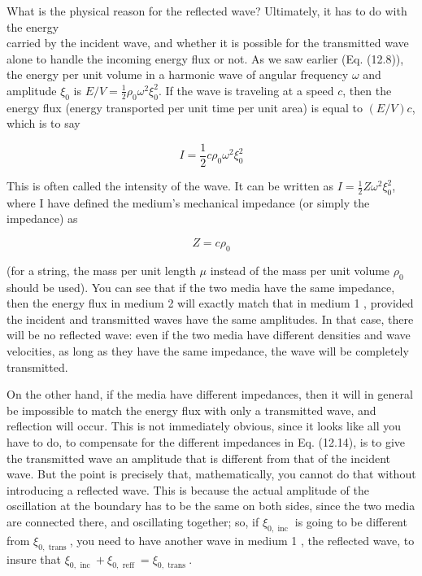 \documentclass[10pt]{article}
\begin{document}
What is the physical reason for the reflected wave? Ultimately, it has to do with the energy\\
carried by the incident wave, and whether it is possible for the transmitted wave alone to handle the incoming energy flux or not. As we saw earlier (Eq. (12.8)), the energy per unit volume in a harmonic wave of angular frequency $\omega$ and amplitude $\xi_{0}$ is $E / V=\frac{1}{2} \rho_{0} \omega^{2} \xi_{0}^{2}$. If the wave is traveling at a speed $c$, then the energy flux (energy transported per unit time per unit area) is equal to $(E / V) c$, which is to say


\begin{equation*}
I=\frac{1}{2} c \rho_{0} \omega^{2} \xi_{0}^{2} \tag{12.14}
\end{equation*}


This is often called the intensity of the wave. It can be written as $I=\frac{1}{2} Z \omega^{2} \xi_{0}^{2}$, where I have defined the medium's mechanical impedance (or simply the impedance) as


\begin{equation*}
Z=c \rho_{0} \tag{12.15}
\end{equation*}


(for a string, the mass per unit length $\mu$ instead of the mass per unit volume $\rho_{0}$ should be used). You can see that if the two media have the same impedance, then the energy flux in medium 2 will exactly match that in medium 1 , provided the incident and transmitted waves have the same amplitudes. In that case, there will be no reflected wave: even if the two media have different densities and wave velocities, as long as they have the same impedance, the wave will be completely transmitted.

On the other hand, if the media have different impedances, then it will in general be impossible to match the energy flux with only a transmitted wave, and reflection will occur. This is not immediately obvious, since it looks like all you have to do, to compensate for the different impedances in Eq. (12.14), is to give the transmitted wave an amplitude that is different from that of the incident wave. But the point is precisely that, mathematically, you cannot do that without introducing a reflected wave. This is because the actual amplitude of the oscillation at the boundary has to be the same on both sides, since the two media are connected there, and oscillating together; so, if $\xi_{0, \text { inc }}$ is going to be different from $\xi_{0, \text { trans }}$, you need to have another wave in medium 1 , the reflected wave, to insure that $\xi_{0, \text { inc }}+\xi_{0, \text { reff }}=\xi_{0, \text { trans }}$.
\end{document}
